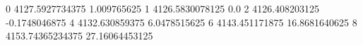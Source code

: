 0 4127.5927734375 1.009765625
1 4126.5830078125 0.0
2 4126.408203125 -0.1748046875
4 4132.630859375 6.0478515625
6 4143.451171875 16.8681640625
8 4153.74365234375 27.16064453125
